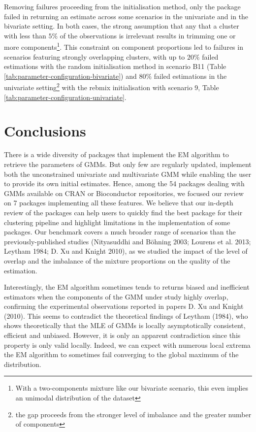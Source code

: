 Removing failures proceeding from the initialisation method, only the  package failed in returning an estimate across some scenarios in the univariate and in the bivariate setting. In both cases, the strong assumption that any that a cluster with less than \(5\%\) of the observations is irrelevant results in trimming one or more components\footnote{With a two-components mixture like our bivariate scenario, this even implies an unimodal distribution of the dataset}. This constraint on component proportions led to failures in scenarios featuring strongly overlapping clusters, with up to \(20\%\) failed estimations with the random initialisation method in scenario
B11 (Table \ref{tab:parameter-configuration-bivariate}) and \(80\%\) failed estimations in the univariate setting\footnote{the gap proceeds from the stronger level of imbalance and the greater number of components} with the rebmix initialisation with scenario 9, Table \ref{tab:parameter-configuration-univariate}.

\hypertarget{conclusions}{%
\section{Conclusions}\label{conclusions}}

There is a wide diversity of packages that implement the EM algorithm to
retrieve the parameters of GMMs. But only few are regularly updated,
implement both the unconstrained univariate and multivariate GMM while enabling the user to provide
its own initial estimates. Hence, among the 54 packages dealing
with GMMs available on CRAN or Bioconductor repositories, we focused our
review on 7 packages implementing all these features. We believe that our in-depth review of the packages can help users to quickly find the best package for their clustering
pipeline and highlight limitations in the implementation of some
packages. Our benchmark covers a much broader range of scenarios
than the previously-published studies (Nityasuddhi and Böhning 2003; Lourens et al. 2013; Leytham 1984; D. Xu and Knight 2010), as we studied the impact of the
level of overlap and the imbalance of the mixture proportions on the
quality of the estimation.

\color{green}

Interestingly, the EM algorithm sometimes tends to returns biased and
inefficient estimators when the components of the GMM under study highly overlap, confirming the experimental observations reported in papers
D. Xu and Knight (2010). This seems to contradict the theoretical findings of Leytham (1984), who shows
theoretically that the MLE of GMMs is locally asymptotically consistent,
efficient and unbiased. However, it is only an apparent contradiction since this property is only valid locally. Indeed, we can expect with numerous local extrema the EM algorithm to sometimes fail converging to the global maximum of the distribution.

